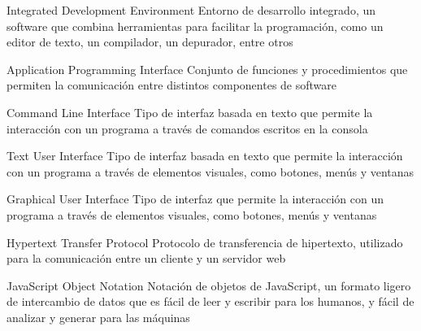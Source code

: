 {Integrated Development Environment}
{Entorno de desarrollo integrado, un software que combina herramientas para facilitar la programación, como un editor de texto, un compilador, un depurador, entre otros}

{Application Programming Interface}
{Conjunto de funciones y procedimientos que permiten la comunicación entre distintos componentes de software}


{Command Line Interface}
{Tipo de interfaz basada en texto que permite la interacción con un programa a través de comandos escritos en la consola}

{Text User Interface}
{Tipo de interfaz basada en texto que permite la interacción con un programa a través de elementos visuales, como botones, menús y ventanas}

{Graphical User Interface}
{Tipo de interfaz que permite la interacción con un programa a través de elementos visuales, como botones, menús y ventanas}

{Hypertext Transfer Protocol}
{Protocolo de transferencia de hipertexto, utilizado para la comunicación entre un cliente y un servidor web}

{JavaScript Object Notation}
{Notación de objetos de JavaScript, un formato ligero de intercambio de datos que es fácil de leer y escribir para los humanos, y fácil de analizar y generar para las máquinas}